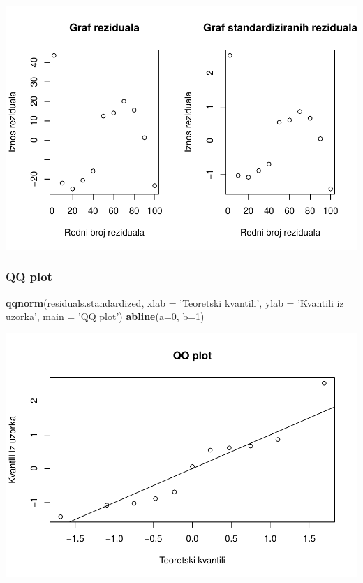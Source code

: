\documentclass[]{article}
\newenvironment{Shaded}{\begin{snugshade}}{\end{snugshade}}
\newcommand{\KeywordTok}[1]{\textcolor[rgb]{0.13,0.29,0.53}{\textbf{{#1}}}}
\newcommand{\DataTypeTok}[1]{\textcolor[rgb]{0.13,0.29,0.53}{{#1}}}
\newcommand{\DecValTok}[1]{\textcolor[rgb]{0.00,0.00,0.81}{{#1}}}
\newcommand{\StringTok}[1]{\textcolor[rgb]{0.31,0.60,0.02}{{#1}}}
\newcommand{\NormalTok}[1]{{#1}}
\begin{document}
\includegraphics{Izvjestaj_files/figure-latex/unnamed-chunk-5-1.pdf}

\subsubsection{QQ plot}\label{qq-plot}

\begin{Shaded}
\begin{Highlighting}[]
\KeywordTok{qqnorm}\NormalTok{(residuals.standardized, }\DataTypeTok{xlab =} \StringTok{'Teoretski kvantili'}\NormalTok{, }\DataTypeTok{ylab =} \StringTok{'Kvantili iz uzorka'}\NormalTok{,}
       \DataTypeTok{main =} \StringTok{'QQ plot'}\NormalTok{)}
\KeywordTok{abline}\NormalTok{(}\DataTypeTok{a=}\DecValTok{0}\NormalTok{, }\DataTypeTok{b=}\DecValTok{1}\NormalTok{)}
\end{Highlighting}
\end{Shaded}

\includegraphics{Izvjestaj_files/figure-latex/unnamed-chunk-6-1.pdf}
\end{document}

